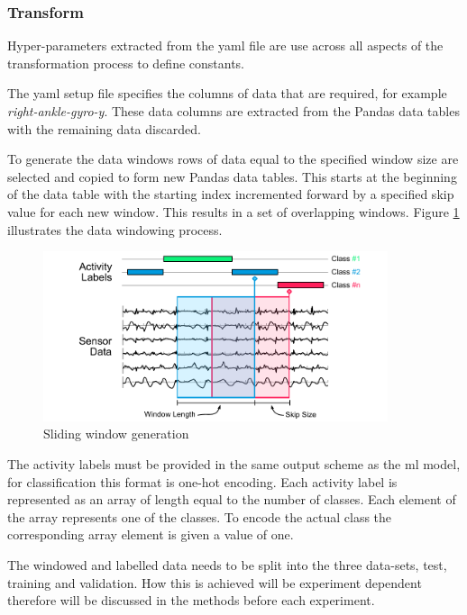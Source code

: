  
\subsubsection{Transform}
Hyper-parameters extracted from the \acrshort{yaml} file are use across all aspects of the transformation process to define constants.

The \acrshort{yaml} setup file specifies the columns of data that are required, for example \textit{right-ankle-gyro-y}. These data columns are extracted from the Pandas data tables with the remaining data discarded.

To generate the data windows rows of data equal to the specified window size are selected and copied to form new Pandas data tables. This starts at the beginning of the data table with the starting index incremented forward by a specified skip value for each new window. This results in a set of overlapping windows. Figure \ref{fig:methods-data-window-generation} illustrates the data windowing process.

\begin{figure}[hbt]
    \centering
    \includegraphics[width=0.9\textwidth]{content/3-Methods/Sliding_Window.pdf}
    \caption{Sliding window generation}
    \label{fig:methods-data-window-generation}
\end{figure}

The activity labels must be provided in the same output scheme as the \acrshort{ml} model, for classification this format is one-hot encoding. Each activity label is represented as an array of length equal to the number of classes. Each element of the array represents one of the classes. To encode the actual class the corresponding array element is given a value of one.

The windowed and labelled data needs to be split into the three data-sets, test, training and validation. How this is achieved will be experiment dependent therefore will be discussed in the methods before each experiment.

